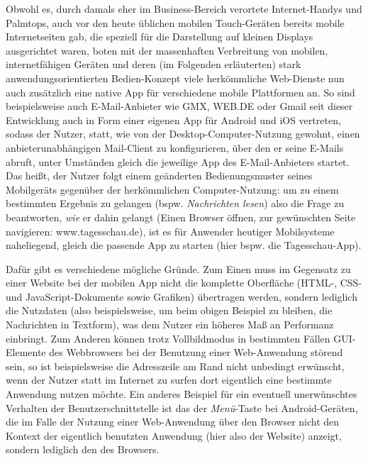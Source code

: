 Obwohl es, durch damals eher im Business-Bereich verortete Internet-Handys und Palmtops, auch vor den heute üblichen mobilen Touch-Geräten bereits mobile Internetseiten gab, die speziell für die Darstellung auf kleinen Displays ausgerichtet waren, boten mit der massenhaften Verbreitung von mobilen, internetfähigen Geräten und deren (im Folgenden erläuterten) stark anwendungsorientierten Bedien-Konzept viele herkömmliche Web-Dienste nun auch zusätzlich eine native App für verschiedene mobile Plattformen an.
So sind beispielsweise auch E-Mail-Anbieter wie GMX\cite{gmx}, WEB.DE\cite{web.de} oder Gmail\cite{gmail} seit dieser Entwicklung auch in Form einer eigenen App für Android und iOS vertreten, sodass der Nutzer, statt, wie von der Desktop-Computer-Nutzung gewohnt, einen anbieterunabhängigen Mail-Client zu konfigurieren, über den er seine E-Mails abruft, unter Umständen gleich die jeweilige App des E-Mail-Anbieters startet. 
Das heißt, der Nutzer folgt einem geänderten Bedienungsmuster seines Mobilgeräts gegenüber der herkömmlichen Computer-Nutzung: um zu einem bestimmten Ergebnis zu gelangen (bspw. \emph{Nachrichten lesen}) also die Frage zu beantworten, \emph{wie} er dahin gelangt (Einen Browser öffnen, zur gewünschten Seite navigieren: www.tagesschau.de), ist es für Anwender heutiger Mobilsysteme naheliegend, gleich die passende App zu starten (hier bspw. die Tagesschau-App).

Dafür gibt es verschiedene mögliche Gründe. Zum Einen muss im Gegensatz zu einer Website bei der mobilen App nicht die komplette Oberfläche (HTML-, CSS- und JavaScript-Dokumente sowie Grafiken) übertragen werden, sondern lediglich die Nutzdaten (also beispielsweise, um beim obigen Beispiel zu bleiben, die Nachrichten in Textform), was dem Nutzer ein höheres Maß an Performanz einbringt.
Zum Anderen können trotz Vollbildmodus in bestimmten Fällen GUI-Elemente des Webbrowsers bei der Benutzung einer Web-Anwendung störend sein, so ist beispielsweise die Adresszeile am Rand nicht unbedingt erwünscht, wenn der Nutzer statt im Internet zu surfen dort eigentlich eine bestimmte Anwendung nutzen möchte. 
Ein anderes Beispiel für ein eventuell unerwünschtes Verhalten der Benutzerschnittstelle ist das der \emph{Menü}-Taste bei Android-Geräten, die im Falle der Nutzung einer Web-Anwendung über den Browser nicht den Kontext der eigentlich benutzten Anwendung (hier also der Website) anzeigt, sondern lediglich den des Browsers.



